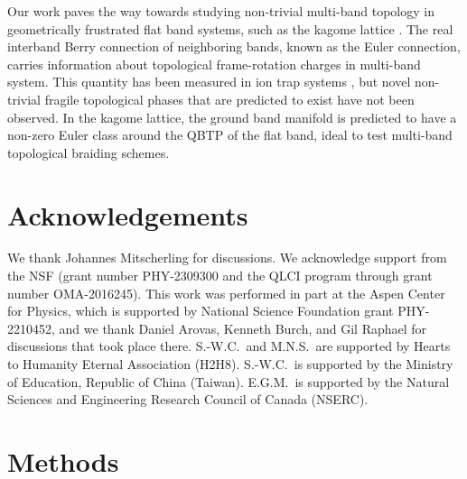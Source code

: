 \documentclass[superscriptaddress, reprint, amsmath, amssymb, aps, prl]{revtex4-2}
\renewcommand{\figurename}{Fig.}
\begin{document}
Our work paves the way towards studying non-trivial multi-band topology in geometrically frustrated flat band systems, such as the kagome lattice \cite{jo12kag}. The real interband Berry connection of neighboring bands, known as the Euler connection, carries information about topological frame-rotation charges in multi-band system. This quantity has been measured in ion trap systems \cite{zhao_quantum_2022}, but novel non-trivial fragile topological phases that are predicted to exist \cite{slager_non-abelian_2024, po_fragile_2018, unal_topological_2020} have not been observed. In the kagome lattice, the ground band manifold is predicted to have a non-zero Euler class around the QBTP of the flat band, ideal to test multi-band topological braiding schemes.

\section*{Acknowledgements}
We thank Johannes Mitscherling for discussions.  We acknowledge support from the NSF (grant number PHY-2309300 and the QLCI program through grant number OMA-2016245).  This work was performed in part at the Aspen Center for Physics, which is supported by National Science Foundation grant PHY-2210452, and we thank Daniel Arovas, Kenneth Burch, and Gil Raphael for discussions that took place there. S.-W.C.\ and M.N.S.\ are supported by Hearts to Humanity Eternal Association (H2H8). S.-W.C.\ is supported by the Ministry of Education, Republic of China (Taiwan). E.G.M.\ is supported by the Natural Sciences and Engineering Research Council of Canada (NSERC).

\section{Methods}\label{sec:methods}
\setcounter{figure}{0}
\renewcommand{\figurename}{Extended Data Fig.}
\end{document}
